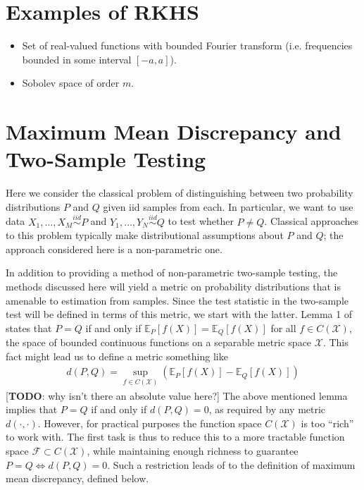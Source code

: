 \documentclass[12pt]{article}
\newcommand{\E}{\mathbb{E}}
\begin{document}
 \section{Examples of RKHS}
 \begin{itemize}
 \item Set of real-valued functions with bounded Fourier transform (i.e. frequencies bounded in some interval $[-a, a]$). 
 \item Sobolev space of order $m$. 
 \end{itemize}


\section{Maximum Mean Discrepancy and Two-Sample Testing}
Here we consider the classical problem of distinguishing between two probability distributions $P$ and $Q$ given iid samples from each. In particular, we want to use data 
$X_1, \dots, X_M \overset{iid}{\sim} P$ and $Y_1, \dots, Y_N \overset{iid}{\sim} Q$ to test whether $P \neq Q$. Classical approaches to this problem typically make distributional 
assumptions about $P$ and $Q$; the approach considered here is a non-parametric one. 

In addition to providing a method of non-parametric two-sample testing, the methods discussed here will yield a metric on probability distributions that is amenable to estimation 
from samples. Since the test statistic in the two-sample test will be defined in terms of this metric, we start with the latter. Lemma 1 of \cite{Gretton1} states that 
$P = Q$ if and only if $\E_P[f(X)] = \E_Q[f(X)]$ for all $f \in C(\mathcal{X})$, the space of bounded continuous functions on a separable metric space 
$\mathcal{X}$. This fact might lead us to define a metric something like 
\begin{align*}
d(P, Q) = \sup_{f \in C(\mathcal{X})} \left(\E_P[f(X)] - \E_Q[f(X)]\right)
\end{align*}
[\textbf{TODO}: why isn't there an absolute value here?]
The above mentioned lemma implies that $P = Q$ if and only if $d(P, Q) = 0$, as required by any metric $d(\cdot, \cdot)$. However, for practical purposes the function space 
$C(\mathcal{X})$ is too ``rich'' to work with. The first task is thus to reduce this to a more tractable function space $\mathcal{F} \subset C(\mathcal{X})$, 
while maintaining enough richness to guarantee $P = Q \iff d(P, Q) = 0$. Such a restriction leads of to the definition of maximum mean discrepancy, defined below. 
\end{document}
